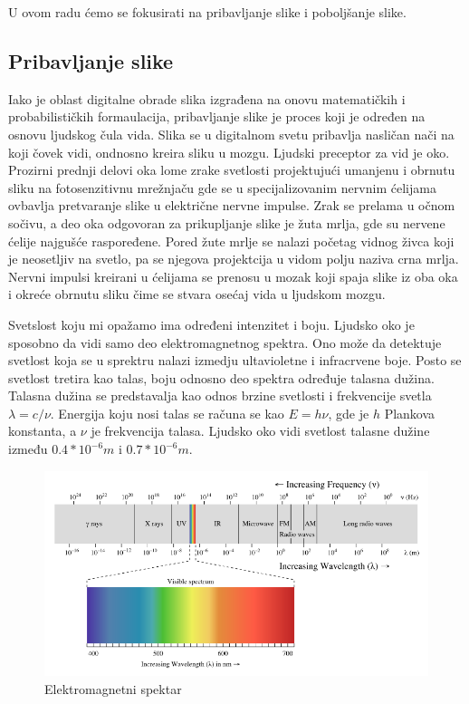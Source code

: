 \documentclass[a4paper,12pt,titlepage]{article}
\begin{document}
U ovom radu ćemo se fokusirati na pribavljanje slike i poboljšanje slike.

\subsection{Pribavljanje slike}%

Iako je oblast digitalne obrade slika izgrađena na onovu matematičkih i probabilističkih formaulacija, pribavljanje slike je proces koji je određen na osnovu ljudskog čula vida. Slika se u digitalnom svetu pribavlja nasličan nači na koji čovek vidi, ondnosno kreira sliku u mozgu. Ljudski preceptor za vid je oko. Prozirni prednji delovi oka lome zrake svetlosti projektujući umanjenu i obrnutu sliku na fotosenzitivnu mrežnjaču gde se u specijalizovanim nervnim ćelijama ovbavlja pretvaranje slike u električne nervne impulse. Zrak se prelama u očnom sočivu, a deo oka odgovoran za prikupljanje slike je žuta mrlja, gde su nervene ćelije najgušće raspoređene. Pored žute mrlje se nalazi početag vidnog živca koji je neosetljiv na svetlo, pa se njegova projektcija u vidom polju naziva crna mrlja. Nervni impulsi kreirani u ćelijama se prenosu u mozak koji spaja slike iz oba oka i okreće obrnutu sliku čime se stvara osećaj vida u ljudskom mozgu.

Svetslost koju mi opažamo ima određeni intenzitet i boju. Ljudsko oko je sposobno da vidi samo deo elektromagnetnog spektra. Ono može da detektuje svetlost koja se u sprektru nalazi izmedju ultavioletne i infracrvene boje. Posto se svetlost tretira kao talas, boju odnosno deo spektra određuje talasna dužina. Talasna dužina se predstavalja kao odnos brzine svetlosti i frekvencije svetla $\lambda = c / \nu$. Energija koju nosi talas se računa se kao $E = h \nu$, gde je $h$ Plankova konstanta, a $\nu$ je frekvencija talasa. Ljudsko oko vidi svetlost talasne dužine između $0.4 * 10^{-6}m$ i $0.7 * 10^{-6}m$.

\begin{figure}[ht!]
\centering
\includegraphics[width=120mm]{img/spektar.png}
\caption{Elektromagnetni spektar}
\label{spektar}
\end{figure} 
\end{document}
